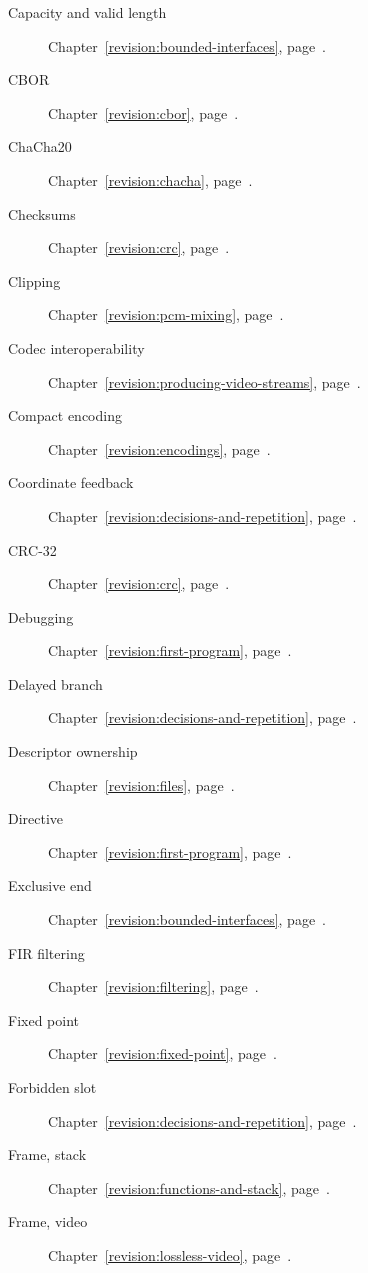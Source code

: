 \begin{description}
  \item[Capacity and valid length] Chapter~\ref{revision:bounded-interfaces}, page~\pageref{revision:bounded-interfaces}.
  \item[CBOR] Chapter~\ref{revision:cbor}, page~\pageref{revision:cbor}.
  \item[ChaCha20] Chapter~\ref{revision:chacha}, page~\pageref{revision:chacha}.
  \item[Checksums] Chapter~\ref{revision:crc}, page~\pageref{revision:crc}.
  \item[Clipping] Chapter~\ref{revision:pcm-mixing}, page~\pageref{revision:pcm-mixing}.
  \item[Codec interoperability] Chapter~\ref{revision:producing-video-streams}, page~\pageref{revision:producing-video-streams}.
  \item[Compact encoding] Chapter~\ref{revision:encodings}, page~\pageref{revision:encodings}.
  \item[Coordinate feedback] Chapter~\ref{revision:decisions-and-repetition}, page~\pageref{revision:decisions-and-repetition}.
  \item[CRC-32] Chapter~\ref{revision:crc}, page~\pageref{revision:crc}.
  \item[Debugging] Chapter~\ref{revision:first-program}, page~\pageref{revision:first-program}.
  \item[Delayed branch] Chapter~\ref{revision:decisions-and-repetition}, page~\pageref{revision:decisions-and-repetition}.
  \item[Descriptor ownership] Chapter~\ref{revision:files}, page~\pageref{revision:files}.
  \item[Directive] Chapter~\ref{revision:first-program}, page~\pageref{revision:first-program}.
  \item[Exclusive end] Chapter~\ref{revision:bounded-interfaces}, page~\pageref{revision:bounded-interfaces}.
  \item[FIR filtering] Chapter~\ref{revision:filtering}, page~\pageref{revision:filtering}.
  \item[Fixed point] Chapter~\ref{revision:fixed-point}, page~\pageref{revision:fixed-point}.
  \item[Forbidden slot] Chapter~\ref{revision:decisions-and-repetition}, page~\pageref{revision:decisions-and-repetition}.
  \item[Frame, stack] Chapter~\ref{revision:functions-and-stack}, page~\pageref{revision:functions-and-stack}.
  \item[Frame, video] Chapter~\ref{revision:lossless-video}, page~\pageref{revision:lossless-video}.

\end{description}
